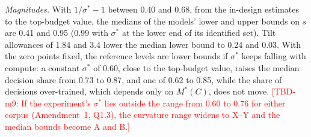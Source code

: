 \textit{Magnitudes.} With $1/\sigma^*-1$ between 0.40 and 0.68, from the in-design estimates to the top-budget value,
the medians of the models' lower and upper bounds on $s$ are 0.41 and 0.95 (0.99 with $\sigma^*$ at the lower end of its
identified set). Tilt allowances of 1.84 and 3.4 lower the median lower bound to 0.24 and 0.03. With the zero points
fixed, the reference levels are lower bounds if $\sigma^*$ keeps falling with compute: a constant $\sigma^*$ of 0.60,
close to the top-budget value, raises the median decision share from 0.73 to 0.87, and one of 0.62 to 0.85, while the
share of decisions over-trained, which depends only on $M^*(C)$, does not move. \textcolor{red}{[TBD-m9: If the
experiment's $\sigma^*$ lies outside the range from 0.60 to 0.76 for either corpus (Amendment~1, Q1.3), the curvature
range widens to X--Y and the median bounds become A and B.]}

